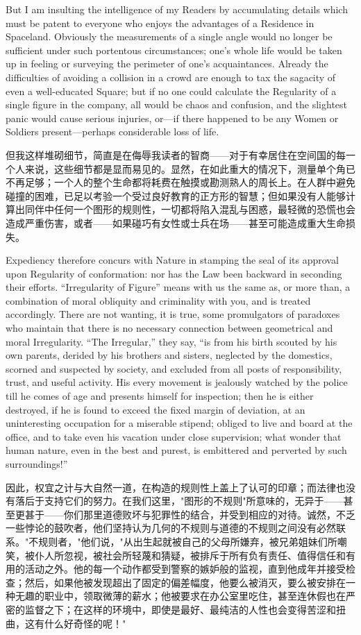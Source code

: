 \documentclass[12pt,UTF8]{ctexbook}
\begin{document}
But I am insulting the intelligence of my Readers by accumulating details which must be patent to everyone who enjoys the advantages of a Residence in Spaceland. Obviously the measurements of a single angle would no longer be sufficient under such portentous circumstances; one's whole life would be taken up in feeling or surveying the perimeter of one's acquaintances. Already the difficulties of avoiding a collision in a crowd are enough to tax the sagacity of even a well-educated Square; but if no one could calculate the Regularity of a single figure in the company, all would be chaos and confusion, and the slightest panic would cause serious injuries, or---if there happened to be any Women or Soldiers present---perhaps considerable loss of life.

但我这样堆砌细节，简直是在侮辱我读者的智商——对于有幸居住在空间国的每一个人来说，这些细节都是显而易见的。显然，在如此重大的情况下，测量单个角已不再足够；一个人的整个生命都将耗费在触摸或勘测熟人的周长上。在人群中避免碰撞的困难，已足以考验一个受过良好教育的正方形的智慧；但如果没有人能够计算出同伴中任何一个图形的规则性，一切都将陷入混乱与困惑，最轻微的恐慌也会造成严重伤害，或者——如果碰巧有女性或士兵在场——甚至可能造成重大生命损失。

Expediency therefore concurs with Nature in stamping the seal of its approval upon Regularity of conformation: nor has the Law been backward in seconding their efforts. ``Irregularity of Figure'' means with us the same as, or more than, a combination of moral obliquity and criminality with you, and is treated accordingly. There are not wanting, it is true, some promulgators of paradoxes who maintain that there is no necessary connection between geometrical and moral Irregularity. ``The Irregular,'' they say, ``is from his birth scouted by his own parents, derided by his brothers and sisters, neglected by the domestics, scorned and suspected by society, and excluded from all posts of responsibility, trust, and useful activity. His every movement is jealously watched by the police till he comes of age and presents himself for inspection; then he is either destroyed, if he is found to exceed the fixed margin of deviation, at an uninteresting occupation for a miserable stipend; obliged to live and board at the office, and to take even his vacation under close supervision; what wonder that human nature, even in the best and purest, is embittered and perverted by such surroundings!''

因此，权宜之计与大自然一道，在构造的规则性上盖上了认可的印章；而法律也没有落后于支持它们的努力。在我们这里，"图形的不规则"所意味的，无异于——甚至更甚于——你们那里道德败坏与犯罪性的结合，并受到相应的对待。诚然，不乏一些悖论的鼓吹者，他们坚持认为几何的不规则与道德的不规则之间没有必然联系。"不规则者，"他们说，"从出生起就被自己的父母所嫌弃，被兄弟姐妹们所嘲笑，被仆人所忽视，被社会所轻蔑和猜疑，被排斥于所有负有责任、值得信任和有用的活动之外。他的每一个动作都受到警察的嫉妒般的监视，直到他成年并接受检查；然后，如果他被发现超出了固定的偏差幅度，他要么被消灭，要么被安排在一种无趣的职业中，领取微薄的薪水；他被要求在办公室里吃住，甚至连休假也在严密的监督之下；在这样的环境中，即使是最好、最纯洁的人性也会变得苦涩和扭曲，这有什么好奇怪的呢！"
\end{document}
